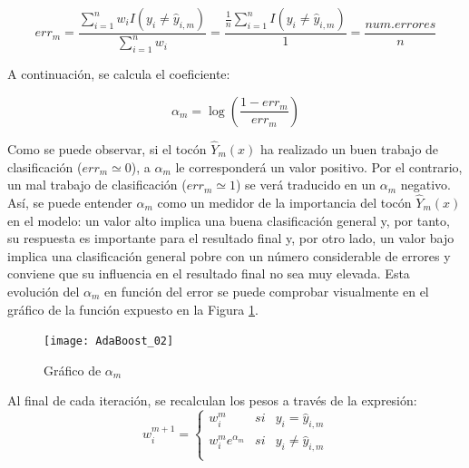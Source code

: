 \documentclass[12pt,twoside]{article}
\begin{document}
\begin{equation*}
err_m = \frac{\sum_{i=1}^{n} w_i I(y_i \neq \hat{y}_{i, m})}{\sum_{i=1}^{n} w_i} = \frac{\frac{1}{n} \sum_{i=1}^{n}I(y_i \neq \hat{y}_{i, m})}{1} = \frac{num.errores}{n}
\end{equation*}

A continuación, se calcula el coeficiente:

\begin{equation*}
\alpha _m = \log \left( \frac{1 - err_m}{err_m} \right)
\end{equation*}

Como se puede observar, si el tocón $\hat{Y}_m(x)$ ha realizado un buen trabajo de clasificación ($err_m \simeq 0$), a $\alpha_m$ le corresponderá un valor positivo. Por el contrario, un mal trabajo de clasificación ($err_m \simeq 1$) se verá traducido en un $\alpha_m$ negativo. Así, se puede entender $\alpha_m$ como un medidor de la importancia del tocón $\hat{Y}_m(x)$ en el modelo: un valor alto implica una buena clasificación general y, por tanto, su respuesta es importante para el resultado final y, por otro lado, un valor bajo implica una clasificación general pobre con un número considerable de errores y conviene que su influencia en el resultado final no sea muy elevada. Esta evolución del $\alpha_m$ en función del error se puede comprobar visualmente en el gráfico de la función expuesto en la Figura \ref{fig: AdaBoost_02}.

\begin{figure}[h]
\centering
\texttt{[image: AdaBoost\_02]}
\caption{Gráfico de $\alpha_m$}
\label{fig: AdaBoost_02}
\end{figure}

Al final de cada iteración, se recalculan los pesos a través de la expresión:
\begin{equation*}
w_i^{m+1} =
\left\{
\begin{array}{crl}
w_i^m & si & y_i = \hat{y}_{i, m} \\
w_i^m e^{\alpha_m} & si & y_i \neq \hat{y}_{i, m} \\
\end{array}
\right.
\end{equation*}
\end{document}
